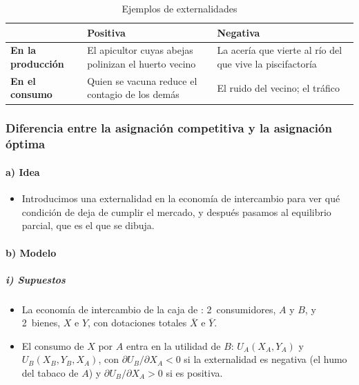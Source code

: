 \documentclass[11pt]{article}
\begin{document}
\begin{table}[H]
\centering
\caption{Ejemplos de externalidades}\label{tab:externalidades}
\begin{tabular}{>{\centering\arraybackslash}m{3.0cm}|>{\centering\arraybackslash}m{5.4cm}|>{\centering\arraybackslash}m{5.4cm}}
\rowcolor{tceeazulpalido} & \textbf{Positiva} & \textbf{Negativa} \\ \hline
\textbf{En la producción} & El apicultor cuyas abejas polinizan el huerto vecino & La acería que vierte al río del que vive la piscifactoría \\ \hline
\textbf{En el consumo} & Quien se vacuna reduce el contagio de los demás & El ruido del vecino; el tráfico \\
\end{tabular}
\end{table}

\subsubsection{Diferencia entre la asignación competitiva y la asignación óptima}\label{sec:externalidades-asignacion}

\paragraph{a) Idea}
\begin{itemize}
\item Introducimos una externalidad en la economía de intercambio para ver qué condición de  deja de cumplir el mercado, y después pasamos al equilibrio parcial, que es el que se dibuja.
\end{itemize}

\paragraph{b) Modelo}

\subparagraph{i) Supuestos}
\begin{itemize}
\item La economía de intercambio de la caja de  : 2~consumidores, $A$ y $B$, y 2~bienes, $X$ e $Y$, con dotaciones totales $\overline{X}$ e $\overline{Y}$.
\item El consumo de $X$ por $A$ entra en la utilidad de $B$: $U_A(X_A,Y_A)$ y $U_B(X_B,Y_B,X_A)$, con $\partial U_B/\partial X_A<0$ si la externalidad es negativa (el humo del tabaco de $A$) y $\partial U_B/\partial X_A>0$ si es positiva.
\end{itemize}
\end{document}
